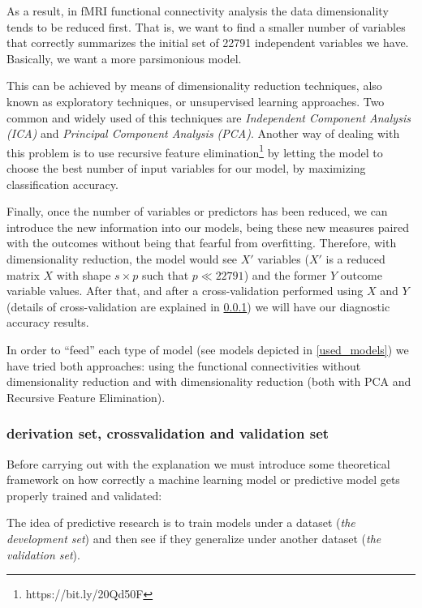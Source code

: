 \documentclass[a4paper,12pt]{elsarticle}  %
\begin{document}
As a result, in fMRI functional connectivity analysis the data dimensionality tends to be reduced first. That is, we want to find a smaller number of variables that correctly summarizes the initial set of 22791 independent variables we have. Basically, we want a more parsimonious model.

This can be achieved by means of dimensionality reduction techniques, also known as exploratory techniques, or unsupervised learning approaches. Two common and widely used of this techniques are \textit{Independent Component Analysis (ICA)} and \textit{Principal Component Analysis (PCA)}.  Another way of dealing with this problem is to use recursive feature elimination\footnote{https://bit.ly/20Qd50F} by letting the model to choose the best number of input variables for our model, by maximizing classification accuracy.

Finally, once the number of variables or predictors has been reduced, we can introduce the new information into our models, being these new measures paired with the outcomes without being that fearful from overfitting. Therefore, with dimensionality reduction, the model would see $X'$ variables ($X'$ is a reduced matrix $X$ with shape $s \times p$ such that $p \ll 22791$) and the former $Y$ outcome variable values. After that, and after a cross-validation performed using $X$ and $Y$ (details of cross-validation are explained in \ref{deriv_valid}) we will have our diagnostic accuracy results.

In order to ``feed'' each type of model (see models depicted in \ref{used_models}) we have tried both approaches: using the functional connectivities without dimensionality reduction and with dimensionality reduction (both with PCA and Recursive Feature Elimination).




\subsubsection{derivation set, crossvalidation and validation set} \label{deriv_valid}
Before carrying out with the explanation we must introduce some theoretical framework on how correctly a machine learning model or predictive model gets properly trained and validated:


The idea of predictive research is to train models under a dataset (\textit{the development set}) and then see if they generalize under another dataset (\textit{the validation set}). 
\end{document}
